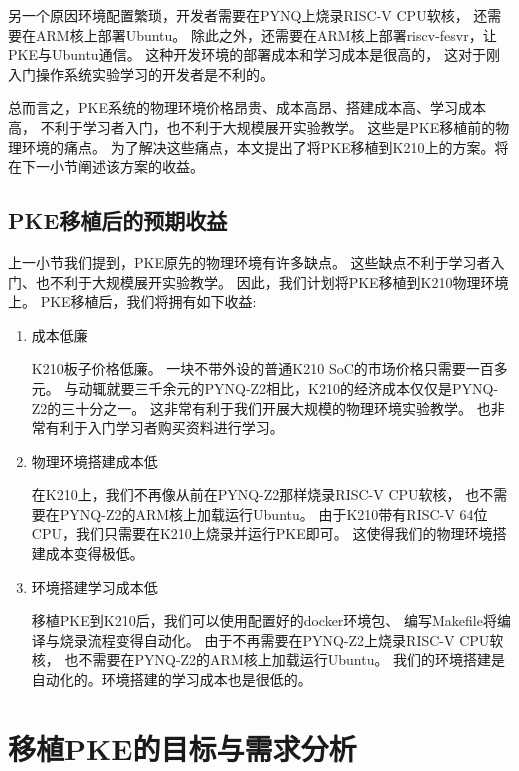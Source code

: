 另一个原因环境配置繁琐，开发者需要在PYNQ上烧录RISC-V CPU软核，
还需要在ARM核上部署Ubuntu。
除此之外，还需要在ARM核上部署riscv-fesvr，让PKE与Ubuntu通信。
这种开发环境的部署成本和学习成本是很高的，
这对于刚入门操作系统实验学习的开发者是不利的。

总而言之，PKE系统的物理环境价格昂贵、成本高昂、搭建成本高、学习成本高，
不利于学习者入门，也不利于大规模展开实验教学。\cite{2021Reform}
这些是PKE移植前的物理环境的痛点。
为了解决这些痛点，本文提出了将PKE移植到K210上的方案。将在下一小节阐述该方案的收益。

\subsection{PKE移植后的预期收益}

上一小节我们提到，PKE原先的物理环境有许多缺点。
这些缺点不利于学习者入门、也不利于大规模展开实验教学。
因此，我们计划将PKE移植到K210物理环境上。
PKE移植后，我们将拥有如下收益:

\begin{enumerate}
    \item 成本低廉
    
    K210板子价格低廉。
    一块不带外设的普通K210 SoC的市场价格只需要一百多元。
    与动辄就要三千余元的PYNQ-Z2相比，K210的经济成本仅仅是PYNQ-Z2的三十分之一。
    这非常有利于我们开展大规模的物理环境实验教学。
    也非常有利于入门学习者购买资料进行学习。

    \item 物理环境搭建成本低
    
    在K210上，我们不再像从前在PYNQ-Z2那样烧录RISC-V CPU软核，
    也不需要在PYNQ-Z2的ARM核上加载运行Ubuntu。
    由于K210带有RISC-V 64位CPU，我们只需要在K210上烧录并运行PKE即可。
    这使得我们的物理环境搭建成本变得极低。

    \item 环境搭建学习成本低
    
    移植PKE到K210后，我们可以使用配置好的docker环境包、
    编写Makefile将编译与烧录流程变得自动化。
    由于不再需要在PYNQ-Z2上烧录RISC-V CPU软核，
    也不需要在PYNQ-Z2的ARM核上加载运行Ubuntu。
    我们的环境搭建是自动化的。环境搭建的学习成本也是很低的。

\end{enumerate}


\section{移植PKE的目标与需求分析}

